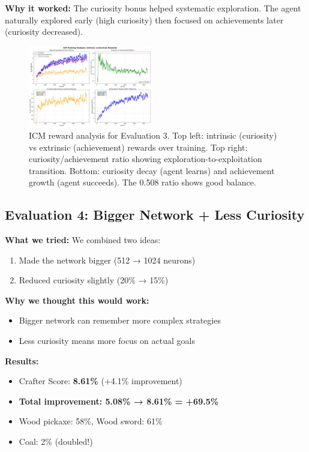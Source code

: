 \documentclass[conference]{IEEEtran}
\begin{document}
\textbf{Why it worked:} The curiosity bonus helped systematic exploration. The agent naturally explored early (high curiosity) then focused on achievements later (curiosity decreased).

\begin{figure}[h!]
\centering
\includegraphics[width=0.48\textwidth]{fig6_icm_improvement2.pdf}
\caption{ICM reward analysis for Evaluation 3. Top left: intrinsic (curiosity) vs extrinsic (achievement) rewards over training. Top right: curiosity/achievement ratio showing exploration-to-exploitation transition. Bottom: curiosity decay (agent learns) and achievement growth (agent succeeds). The 0.508 ratio shows good balance.}
\label{fig:icm_eval3}
\end{figure}

\subsection{Evaluation 4: Bigger Network + Less Curiosity}

\textbf{What we tried:} We combined two ideas:
\begin{enumerate}
    \item Made the network bigger (512 → 1024 neurons)
    \item Reduced curiosity slightly (20\% → 15\%)
\end{enumerate}

\textbf{Why we thought this would work:}
\begin{itemize}
    \item Bigger network can remember more complex strategies
    \item Less curiosity means more focus on actual goals
\end{itemize}

\textbf{Results:}
\begin{itemize}
    \item Crafter Score: \textbf{8.61\%} (+4.1\% improvement)
    \item \textbf{Total improvement: 5.08\% → 8.61\% = +69.5\%}
    \item Wood pickaxe: 58\%, Wood sword: 61\%
    \item Coal: 2\% (doubled!)
\end{itemize}
\end{document}

